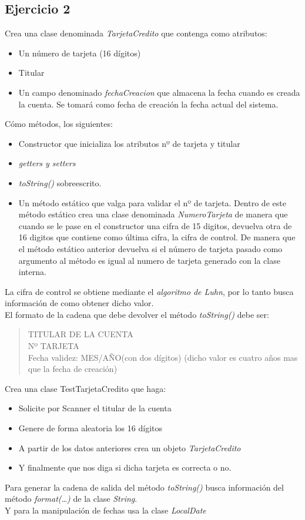 \documentclass[4paper]{article}
\begin{document}
\subsection*{Ejercicio 2}
Crea una clase denominada \emph{TarjetaCredito} que contenga como atributos:
\begin{itemize}
\item Un número de tarjeta (16 dígitos)
\item Titular
\item Un campo denominado \emph{fechaCreacion} que almacena la fecha cuando es creada la cuenta. Se tomará como fecha de creación la fecha actual del sistema.
\end{itemize}
Cómo métodos, los siguientes:
\begin{itemize}
\item Constructor que inicializa los atributos nº de tarjeta y titular
\item \emph{getters y setters}
\item \emph{toString()} sobreescrito.
\item Un método estático que valga para validar el nº de tarjeta. Dentro de este método estático crea una clase denominada \emph{NumeroTarjeta} de manera que cuando se le pase en el constructor una cifra de 15 digitos, devuelva otra de 16 digitos que contiene como última cifra, la cifra de control. De manera que el método estático anterior devuelva si el número de tarjeta pasado como argumento al método es igual al numero de tarjeta generado con la clase interna.
\end{itemize}
La cifra de control se obtiene mediante el \emph{algoritmo de Luhn}, por lo tanto busca información de como obtener dicho valor.\\
El formato de la cadena que debe devolver el método \emph{toString()} debe ser:
\begin{quote}
TITULAR DE LA CUENTA\\
Nº TARJETA\\
Fecha validez: MES/AÑO(con dos dígitos) (dicho valor es cuatro años mas que la fecha de creación)
\end{quote}
Crea una clase TestTarjetaCredito que haga:
\begin{itemize}
\item Solicite por Scanner el titular de la cuenta
\item Genere de forma aleatoria los 16 dígitos
\item A partir de los datos anteriores crea un objeto \emph{TarjetaCredito}
\item Y finalmente que nos diga si dicha tarjeta es correcta o no.
\end{itemize}
Para generar la cadena de salida del método \emph{toString()} busca información del método \emph{format(\dots)} de la clase \emph{String}.\\
Y para la manipulación de fechas usa la clase \emph{LocalDate}
\end{document}
